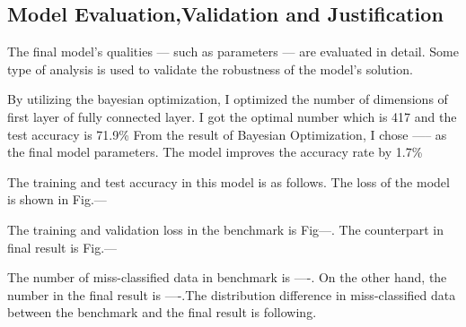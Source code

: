 \subsection{Model Evaluation,Validation and Justification}
The final model’s qualities — such as parameters — are evaluated in detail. Some type of analysis is used to validate the robustness of the model’s solution.

By utilizing the bayesian optimization, I optimized the number of dimensions of first layer of fully connected layer. I got the optimal number which is 417 and the test accuracy is 71.9\%
From the result of Bayesian Optimization, I chose ----- as the final model parameters.
The model improves the accuracy rate by 1.7\%

The training and test accuracy in this model is as follows.
The loss of the model is shown in Fig.--- 



The training and validation loss in the benchmark is Fig---. The counterpart in final result is Fig.---


The number of miss-classified data in benchmark is ----. On the other hand, the number in the final result is ----.The distribution difference in miss-classified data between the benchmark and the final result is following.
